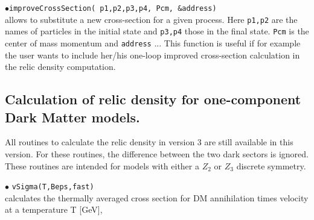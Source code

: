 \documentclass[12pt,a4paper]{article}
\begin{document}
\noindent$\bullet$\verb|improveCrossSection( p1,p2,p3,p4, Pcm, &address)|\\
allows to substitute a new cross-section for a given process. Here \verb|p1,p2| are the names of particles in the initial state and \verb|p3,p4| those in the final state. \verb|Pcm| is the center of mass momentum and \verb|address| ... This function is useful if for example the user wants to include her/his one-loop improved cross-section calculation in the relic density computation.


\subsection{Calculation of relic density for one-component Dark Matter models.}
\label{sec:one_component}
All routines to calculate the relic density in  version 3 are still available in this version. For these routines,  the difference between 
the two dark sectors is ignored. These routines are intended for models with either a $Z_2$ or $Z_3$ discrete symmetry.
  
\noindent
$\bullet$ \verb|vSigma(T,Beps,fast)|\\
calculates the thermally averaged cross section for DM annihilation  times velocity  
at a  temperature T [GeV],
\end{document}
